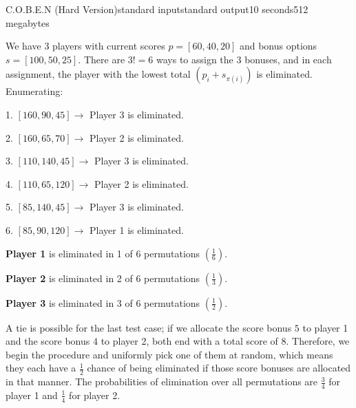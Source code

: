 \begin{problem}{C.O.B.E.N (Hard Version)}{standard input}{standard output}{10 seconds}{512 megabytes}
\Example

\begin{example}
%
\end{example}

\Note
We have 3 players with current scores $p = [60, 40, 20]$ and bonus options $s = [100, 50, 25]$. There are $3! = 6$ ways to assign the 3 bonuses, and in each assignment, the player with the lowest total $(p_i + s_{\pi(i)})$ is eliminated. Enumerating:   

1. $[160,90,45] \to $ Player 3 is eliminated.  

 
2. $[160,65,70]  \to $ Player 2 is eliminated. 

3. $[110,140,45]  \to $ Player 3 is eliminated.  

4. $[110,65,120]  \to $ Player 2 is eliminated. 

5. $[85,140,45]  \to $ Player 3 is eliminated. 

6. $[85,90,120]  \to $ Player 1 is eliminated. 


\textbf{Player 1} is eliminated in 1 of 6 permutations $(\frac{1}{6})$.   

 
\textbf{Player 2} is eliminated in 2 of 6 permutations $(\frac{1}{3})$.    


\textbf{Player 3} is eliminated in 3 of 6 permutations $(\frac{1}{2})$.

A tie is possible for the last test case; if we allocate the score bonus $5$ to player 1 and the score bonus $4$ to player 2, both end with a total score of $8$. Therefore, we begin the procedure and uniformly pick one of them at random, which means they each have a $\frac{1}{2}$ chance of being eliminated if those score bonuses are allocated in that manner. The probabilities of elimination over all permutations are $\frac{3}{4}$ for player 1 and $\frac{1}{4}$ for player 2.

\end{problem}

